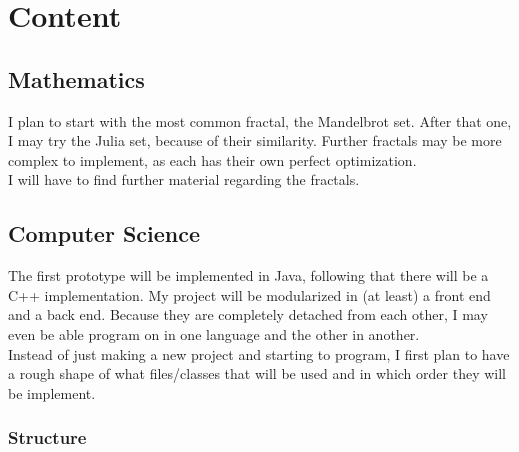 \documentclass[10pt,a4paper]{article}
\begin{document}
	\section{Content}
	\subsection{Mathematics}
	I plan to start with the most common fractal, the Mandelbrot set. After that one, I may try the Julia set, because of their similarity. Further fractals may be more complex to implement, as each has their own perfect optimization.\\
	I will have to find further material regarding the fractals.
	\subsection{Computer Science}
	The first prototype will be implemented in Java, following that there will be a C++ implementation. My project will be modularized in (at least) a front end and a back end. Because they are completely detached from each other, I may even be able program on in one language and the other in another.\\
	Instead of just making a new project and starting to program, I first plan to have a rough shape of what files/classes that will be used and in which order they will be implement. 
	\subsubsection{Structure}
	\begin{center}
	\end{center}
\end{document}
